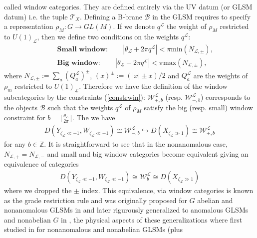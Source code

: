 \documentclass[a4paper,11pt]{article}
\numberwithin{equation}{section}
\begin{document}
called window categories. They are defined entirely via the UV datum (or GLSM 
datum) i.e. the tuple $\mathcal{T}_{X}$. Defining a B-brane $\mathcal{B}$ in 
the GLSM requires to specify a 
representation $\rho_{M}: G\rightarrow GL(M)$. If we denote $q^{\mathcal{L}}$ 
the weight of $\rho_{M}$ restricted to $U(1)_{\mathcal{L}}$, then we 
define two conditions on the weights $q^{\mathcal{L}}$:
\begin{eqnarray}\label{constrwin}
&&\textbf{Small window}:\qquad|\theta_{\mathcal{L}}+2\pi q^{\mathcal{L}}|<\pi 
\mathrm{min}(N_{\mathcal{L},\pm}),\nonumber\\
&&\textbf{Big window}:\qquad|\theta_{\mathcal{L}}+2\pi q^{\mathcal{L}}|<\pi 
\mathrm{max}(N_{\mathcal{L},\pm}),
\end{eqnarray}
where $N_{\mathcal{L},\pm}:=\sum_{a}(Q_{a}^{\mathcal{L}})^{\pm}$, 
$(x)^{\pm}:=(|x|\pm x)/2$ and $Q_{a}^{\mathcal{L}}$ are the weights of 
$\rho_{m}$ restricted to $U(1)_{\mathcal{L}}$. 
Therefore we have the definition of the window subcategories by the constraints 
(\ref{constrwin}): $\mathcal{W}^{\mathcal{L}}_{+,b}$ (resp. 
$\mathcal{W}^{\mathcal{L}}_{-,b}$) corresponds to the objects $\mathcal{B}$ 
such that the weights $q^{\mathcal{L}}$ of $\rho_{M}$ satisfy the big (resp. 
small) window constraint for 
$b=\lfloor\frac{\theta_{\mathcal{L}}}{2\pi}\rfloor$. The we have 
\begin{eqnarray}
D(Y_{\zeta_{\mathcal{L}}\ll -1},W_{\zeta_{\mathcal{L}}\ll 
-1})\cong\mathcal{W}^{\mathcal{L}}_{-,b}\hookrightarrow 
D(X_{\zeta_{\mathcal{L}}\gg 1})\cong\mathcal{W}^{\mathcal{L}}_{+,b} 
\end{eqnarray}
for any $b\in\mathbb{Z}$. It is straightforward to see that in the nonanomalous 
case, $N_{\mathcal{L},+}=N_{\mathcal{L},-}$ and small and big window categories 
become equivalent giving an equivalence of categories
\begin{eqnarray}
D(Y_{\zeta_{\mathcal{L}}\ll -1},W_{\zeta_{\mathcal{L}}\ll 
-1})\cong\mathcal{W}^{\mathcal{L}}_{b}\cong 
D(X_{\zeta_{\mathcal{L}}\gg 1})
\end{eqnarray}
where we dropped the $\pm$ index. This equivalence, via window categories is 
known as the grade restriction rule and was originally proposed for $G$ abelian 
and nonanomalous GLSMs in \cite{Herbst:2008jq} and later rigurously generalized 
to anomalous GLSMs and nonabelian $G$ in 
\cite{halpern2015derived,ballard2019variation}, the physical aspects of these 
generalizations where first studied in 
\cite{Hori:2013ika,hori2019notes} for nonanomalous and nonabelian GLSMs (plus 
\end{document}
